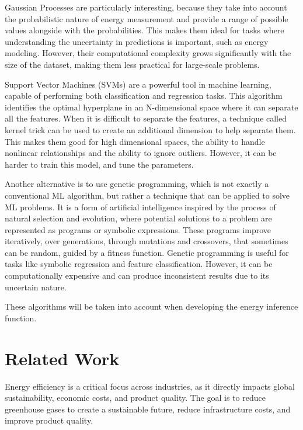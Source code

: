 \documentclass[sigplan]{acmart}
\begin{document}
Gaussian Processes are particularly interesting, because they take into account the probabilistic nature of energy measurement and provide a range of possible values alongside with the probabilities. This makes them ideal for tasks where understanding the uncertainty in predictions is important, such as energy modeling. However, their computational complexity grows significantly with the size of the dataset, making them less practical for large-scale problems.

Support Vector Machines (SVMs) are a powerful tool in machine learning, capable of performing both classification and regression tasks. This algorithm identifies the optimal hyperplane in an N-dimensional space where it can separate all the features. When it is difficult to separate the features, a technique called kernel trick can be used to create an additional dimension to help separate them. This makes them good for high dimensional spaces, the ability to handle nonlinear relationships and the ability to ignore outliers. However, it can be harder to train this model, and tune the parameters.

Another alternative is to use genetic programming, which is not exactly a conventional ML algorithm, but rather a technique that can be applied to solve ML problems. It is a form of artificial intelligence inspired by the process of natural selection and evolution, where potential solutions to a problem are represented as programs or symbolic expressions. These programs improve iteratively, over generations, through mutations and crossovers, that sometimes can be random, guided by a fitness function. Genetic programming is useful for tasks like symbolic regression and feature classification. However, it can be computationally expensive and can produce inconsistent results due to its uncertain nature.

These algorithms will be taken into account when developing the energy inference function.


\section{Related Work} \label{sec:relatedwork}

Energy efficiency is a critical focus across industries, as it directly impacts global sustainability, economic costs, and product quality.  The goal is to reduce greenhouse gases to create a sustainable future, reduce infrastructure costs, and improve product quality\cite{annurev:/content/journals/10.1146/annurev.resource.102308.124234}. 
\end{document}
